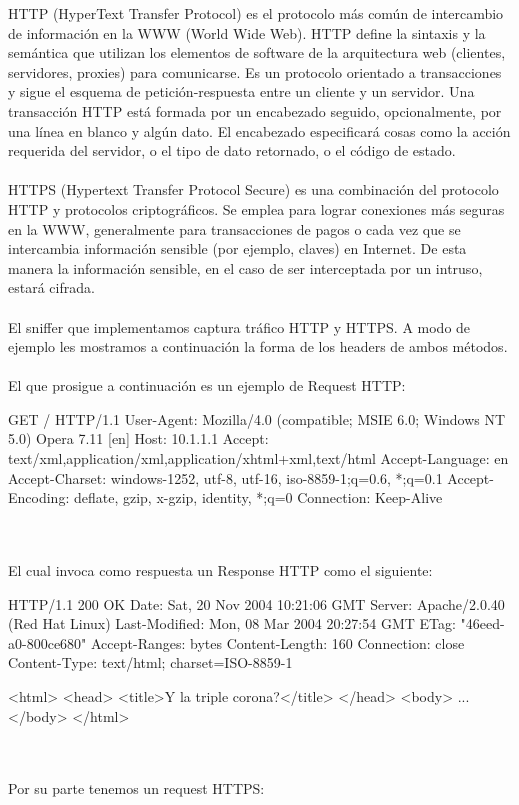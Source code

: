  HTTP (HyperText Transfer Protocol) es el protocolo más común de intercambio de información en la WWW (World Wide Web). HTTP define la sintaxis y la semántica que utilizan los elementos de software de la arquitectura web (clientes, servidores, proxies) para comunicarse. Es un protocolo orientado a transacciones y sigue el esquema de petición-respuesta entre un cliente y un servidor.
Una transacción HTTP está formada por un encabezado seguido, opcionalmente, por una línea en blanco y algún dato. El encabezado especificará cosas como la acción requerida del servidor, o el tipo de dato retornado, o el código de estado.
\\
\\\indent HTTPS (Hypertext Transfer Protocol Secure) es una combinación del protocolo HTTP y protocolos criptográficos. Se emplea para lograr conexiones más seguras en la WWW, generalmente para transacciones de pagos o cada vez que se intercambia información sensible (por ejemplo, claves) en Internet. De esta manera la información sensible, en el caso de ser interceptada por un intruso, estará cifrada.
\\
\\\indent El sniffer que implementamos captura tráfico HTTP y HTTPS. A modo de ejemplo les mostramos a continuación la forma de los headers de ambos métodos.
\\
\\\indent El que prosigue a continuación es un ejemplo de Request HTTP:
\\

	{\small
	\begin{boxedverbatim}
GET / HTTP/1.1
User-Agent: Mozilla/4.0 (compatible; MSIE 6.0; Windows NT 5.0) Opera 7.11  [en]
Host: 10.1.1.1
Accept: text/xml,application/xml,application/xhtml+xml,text/html
Accept-Language: en
Accept-Charset: windows-1252, utf-8, utf-16, iso-8859-1;q=0.6, *;q=0.1
Accept-Encoding: deflate, gzip, x-gzip, identity, *;q=0
Connection: Keep-Alive
	\end{boxedverbatim}
	}
\\
\\\indent El cual invoca como respuesta un Response HTTP como el siguiente:
\\

	{\small
	\begin{boxedverbatim}
HTTP/1.1 200 OK
Date: Sat, 20 Nov 2004 10:21:06 GMT
Server: Apache/2.0.40 (Red Hat Linux)
Last-Modified: Mon, 08 Mar 2004 20:27:54 GMT
ETag: "46eed-a0-800ce680"
Accept-Ranges: bytes
Content-Length: 160
Connection: close
Content-Type: text/html; charset=ISO-8859-1

<html>
	<head>
	<title>Y la triple corona?</title>
	</head>
	<body>
	...
	</body>
</html>
	\end{boxedverbatim}
	}
\\
\\\indent Por su parte tenemos un request HTTPS:
\\

